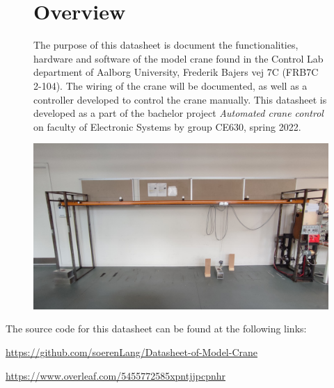 \documentclass[a4paper,12pt,oneside,pdflatex,italian,final,twocolumn]{article}
\begin{document}
\begin{figure}[H]
\begin{minipage}{0.47\textwidth}
\section{Overview}
The purpose of this datasheet is document the functionalities, hardware and software of the model crane found in the Control Lab department of Aalborg University, Frederik Bajers vej 7C (FRB7C 2-104). The wiring of the crane will be documented, as well as a controller developed to control the crane manually. This datasheet is developed as a part of the bachelor project \textit{Automated crane control} on faculty of Electronic Systems by group CE630, spring 2022. 
\end{minipage}
\hfill
\begin{minipage}{0.47\textwidth}
\centering
\includegraphics[width=1\textwidth,right]{pictures/cranePik.jpg}
\end{minipage}
\end{figure}

The source code for this datasheet can be found at the following links:

\url{https://github.com/soerenLang/Datasheet-of-Model-Crane}

\url{https://www.overleaf.com/5455772585xpntjjpcpnhr}








\end{document}
